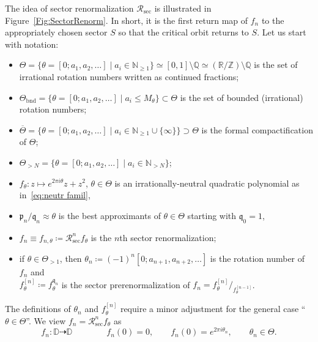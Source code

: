 \documentclass[twoside,leqno]{article}
\theoremstyle{plain}
\newcommand{\Q}{\mathbb{Q}}
\newcommand{\R}{\mathbb{R}}
\newcommand{\N}{\mathbb{N}}
\newcommand{\Z}{\mathbb{Z}}
\newcommand{\Disk}{\mathbb{D}}
\renewcommand{\sec}{{\operatorname{sec}}}
\newcommand{\bnd}{{\mathrm{bnd}}}
\newcommand{\per}{{\mathrm{per}}}
\newcommand{\ovlTheta}{{\overline \Theta}}
\newcommand{\pp}{\mathfrak{p}}
\newcommand{\qq}{\mathfrak{q}}
\newcommand{\RR}{{\mathcal R}}
\begin{document}
The idea of sector renormalization $\RR_{\sec}$ is illustrated in Figure~\ref{Fig:SectorRenorm}. In short, it is the first return map of $f_n$ to the appropriately chosen sector $S$ so that the critical orbit returns to $S$. Let us start with notation: 
 \begin{itemize}
 \item $\Theta=\{\theta=[0;a_1,a_2,\dots] \mid a_i \in \N_{\ge 1}\}\simeq  [0,1]\setminus \Q\simeq (\R/\Z)\setminus \Q$ is the set of irrational rotation numbers written as continued fractions;


  \item $\Theta_\bnd=\{\theta=[0;a_1,a_2,\dots] \mid a_i \le M_\theta\}\subset \Theta$ is the set of bounded (irrational) rotation numbers; 
  
  
 \item $\ovlTheta =\{\theta= [0;a_1,a_2,\dots] \mid a_i \in \N_{\ge 1}\cup \{\infty\}\}\supset \Theta$ is the formal compactification of $\Theta$; 
  \item $\Theta_{>N}=\{\theta=[0;a_1,a_2,\dots] \mid a_i \in \N_{> N}\}$; 
  \item $f_\theta \colon z\mapsto e^{2\pi i \theta}z +z^2$, $\theta\in \Theta$ is an irrationally-neutral quadratic polynomial as in~\eqref{eq:neutr famil},
   \item  $\pp_n/\qq_{n}\approx \theta$ is the best approximants of $\theta\in \Theta$ starting with $\qq_0=1$, 
   \item $f_{n}\equiv f_{n,\theta}\coloneqq \RR_{\sec}^n  f_\theta$ is the $n$th sector renormalization;
    \item if $\theta\in \Theta_{>1}$, then $\theta_n\coloneqq (-1)^n [0;a_{n+1},a_{n+2},\dots]$ is the rotation number of $f_n$ and\\  $f_\theta^{[n]}\coloneqq f^{\qq_n}_\theta$ is the sector prerenormalization of $f_n= f^{[n]}_\theta/_{f^{[n-1]}_\theta}$. 
 \end{itemize}
The definitions of $\theta_n$ and $f^{[n]}_\theta$ require a minor adjustment for the general case ``$\theta\in \Theta$''. We view $f_n=\RR^n_{\sec} f_\theta$ as 
\begin{equation}
    \label{eq:dfn:f_n}f_n\colon \Disk\dashrightarrow \Disk\qquad\qquad f_n(0)=0, \qquad f_n(0)=e^{2\pi i \theta_n}, \qquad \theta_n\in\Theta.
\end{equation}
\end{document}
